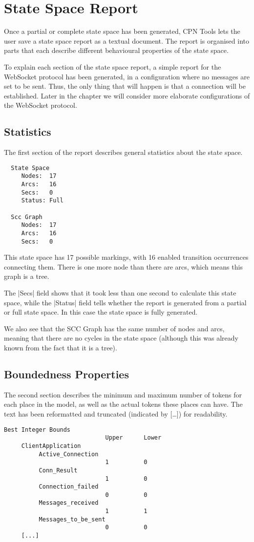 \section{State Space Report}
Once a partial or complete state space has been generated, CPN Tools lets the
user save a state space report as a textual document. The report is organised
into parts that each describe different behavioural properties of the state
space.

To explain each section of the state space report, a simple report for the
WebSocket protocol has been generated, in a configuration where no messages are
set to be sent. Thus, the only thing that will happen is that a connection will
be established. Later in the chapter we will consider more elaborate
configurations of the WebSocket protocol.
	
	\subsection{Statistics}
	The first section of the report describes general statistics about the state
	space.
	\begin{lstlisting}
  State Space
     Nodes:  17
     Arcs:   16
     Secs:   0
     Status: Full

  Scc Graph
     Nodes:  17
     Arcs:   16
     Secs:   0

	\end{lstlisting}
	This state space has 17 possible markings, with 16 enabled transition
	occurrences connecting them. There is one more node than there are arcs, which
	means this graph is a tree.
	
	The |Secs| field shows that it took less than one second to calculate this
	state space, while the |Status| field tells whether the report is generated
	from a partial or full state space. In this case the state space is fully
	generated.
	
	We also see that the SCC Graph has the same number of nodes and arcs, meaning
	that there are no cycles in the state space (although this was already known
	from the fact that it is a tree).
	
	\subsection{Boundedness Properties}
	The second section describes the minimum and maximum number of tokens for
	each place in the model, as well as the actual tokens these places can have.
	The text has been reformatted and truncated (indicated by [\ldots]) for
	readability.
	\begin{lstlisting}[language={}]
  Best Integer Bounds
                             Upper      Lower
     ClientApplication
          Active_Connection
                             1          0
          Conn_Result
                             1          0
          Connection_failed
                             0          0
          Messages_received
                             1          1
          Messages_to_be_sent
                             0          0
     [...]

	\end{lstlisting}
	

